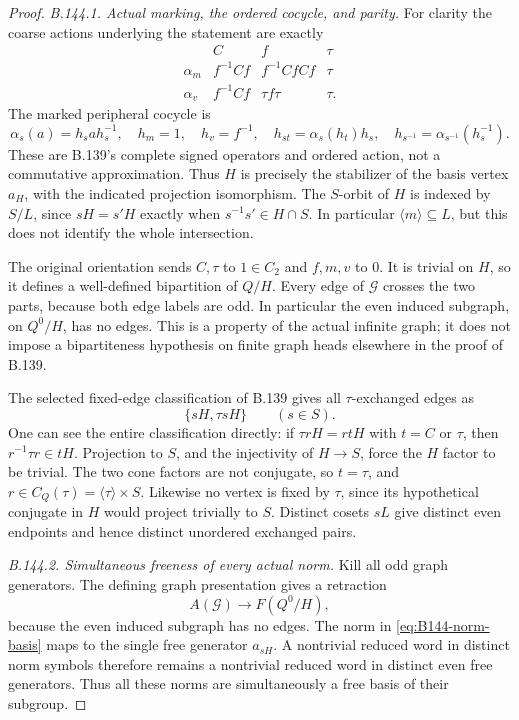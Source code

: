\begin{proof}
\emph{B.144.1. Actual marking, the ordered cocycle, and parity.}
For clarity the coarse actions underlying the statement are exactly
\[
 \begin{array}{c|ccc}
     &C&f&\tau\\ \hline
 \alpha_m&f^{-1}Cf&f^{-1}CfCf&\tau\\
 \alpha_v&f^{-1}Cf&\tau f\tau&\tau.
 \end{array}
\]
The marked peripheral cocycle is
\begin{equation}\label{eq:B144-cocycle}
 \alpha_s(a)=h_sah_s^{-1},\quad h_m=1,\quad h_v=f^{-1},
 \quad h_{st}=\alpha_s(h_t)h_s,
 \quad h_{s^{-1}}=\alpha_{s^{-1}}(h_s^{-1}).
\end{equation}
These are B.139's complete signed operators and ordered action, not
a commutative approximation. Thus $H$ is precisely the stabilizer of
the basis vertex $a_H$, with the indicated projection isomorphism.
The $S$-orbit of $H$ is indexed by $S/L$, since
$sH=s'H$ exactly when $s^{-1}s'\in H\cap S$.
In particular $\langle m\rangle\subseteq L$, but this does not
identify the whole intersection.

The original orientation sends $C,\tau$ to $1\in C_2$ and
$f,m,v$ to $0$. It is trivial on $H$, so it defines a well-defined
bipartition of $Q/H$. Every edge of $\mathcal G$ crosses the two
parts, because both edge labels are odd. In particular the even
induced subgraph, on $Q^0/H$, has no edges. This is a property of
the actual infinite graph; it does not impose a bipartiteness
hypothesis on finite graph heads elsewhere in the proof of B.139.

The selected fixed-edge classification of B.139 gives all
$\tau$-exchanged edges as
\[
 \{sH,\tau sH\}\qquad(s\in S).
\]
One can see the entire classification directly: if
$\tau rH=rtH$ with $t=C$ or $\tau$, then
$r^{-1}\tau r\in tH$. Projection to $S$, and the injectivity of
$H\to S$, force the $H$ factor to be trivial. The two cone factors
are not conjugate, so $t=\tau$, and
$r\in C_Q(\tau)=\langle\tau\rangle\times S$.
Likewise no vertex is fixed by $\tau$, since its hypothetical
conjugate in $H$ would project trivially to $S$.
Distinct cosets $sL$ give distinct even endpoints and hence distinct
unordered exchanged pairs.

\emph{B.144.2. Simultaneous freeness of every actual norm.}
Kill all odd graph generators. The defining graph presentation gives
a retraction
\[
 A(\mathcal G)\longrightarrow F(Q^0/H),
\]
because the even induced subgraph has no edges. The norm in
\eqref{eq:B144-norm-basis} maps to the single free generator
$a_{sH}$. A nontrivial reduced word in distinct norm symbols therefore
remains a nontrivial reduced word in distinct even free generators.
Thus all these norms are simultaneously a free basis of their subgroup.


\end{proof}
